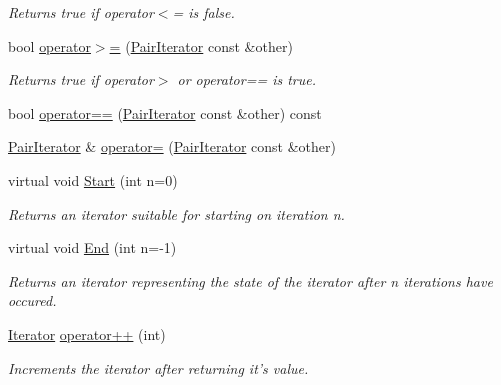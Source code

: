 \begin{DoxyCompactItemize}
\begin{DoxyCompactList}\small\item\em Returns true if operator$<$= is false. \item\end{DoxyCompactList}\item 
bool \hyperlink{classJKBuilder_1_1PairIterator_a0064337d38b8f97d0367be2e9bd31d62}{operator$>$=} (\hyperlink{classJKBuilder_1_1PairIterator}{PairIterator} const \&other)
\begin{DoxyCompactList}\small\item\em Returns true if operator$>$ or operator== is true. \item\end{DoxyCompactList}\item 
bool \hyperlink{classJKBuilder_1_1PairIterator_a6b4e430066f478e5e400edd39ef93968}{operator==} (\hyperlink{classJKBuilder_1_1PairIterator}{PairIterator} const \&other) const 
\item 
\hyperlink{classJKBuilder_1_1PairIterator}{PairIterator} \& \hyperlink{classJKBuilder_1_1PairIterator_a698aa7b3d6495bd74dcff5b93be868a8}{operator=} (\hyperlink{classJKBuilder_1_1PairIterator}{PairIterator} const \&other)
\item 
virtual void \hyperlink{classJKBuilder_1_1Iterator_a34ca36a99b20ae3170babadaffe51ed2}{Start} (int n=0)
\begin{DoxyCompactList}\small\item\em Returns an iterator suitable for starting on iteration n. \item\end{DoxyCompactList}\item 
virtual void \hyperlink{classJKBuilder_1_1Iterator_a5f692b73d2e160450f4617bb75825e11}{End} (int n=-\/1)
\begin{DoxyCompactList}\small\item\em Returns an iterator representing the state of the iterator after n iterations have occured. \item\end{DoxyCompactList}\item 
\hyperlink{classJKBuilder_1_1Iterator}{Iterator} \hyperlink{classJKBuilder_1_1Iterator_ac1702aedba13b4112b891b58dfd78eba}{operator++} (int)
\begin{DoxyCompactList}\small\item\em Increments the iterator after returning it's value. \item\end{DoxyCompactList}\item 

\end{DoxyCompactItemize}
